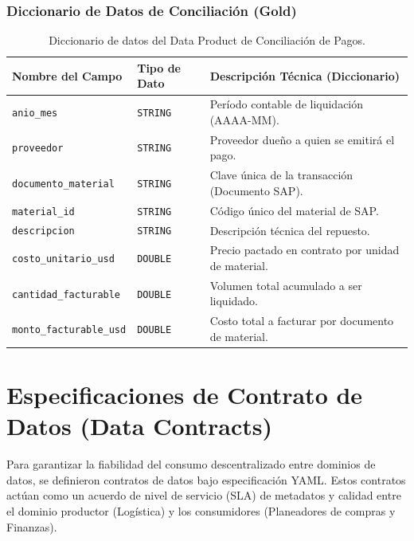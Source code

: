 \documentclass[11pt,a4paper]{article}
\begin{document}
\subsubsection{Diccionario de Datos de Conciliación (Gold)}
\begin{table}[h]
    \centering
    \footnotesize
    \begin{tabular}{lll}
        \toprule
        \textbf{Nombre del Campo} & \textbf{Tipo de Dato} & \textbf{Descripción Técnica (Diccionario)} \\
        \midrule
        \texttt{anio\_mes} & \texttt{STRING} & Período contable de liquidación (AAAA-MM). \\
        \texttt{proveedor} & \texttt{STRING} & Proveedor dueño a quien se emitirá el pago. \\
        \texttt{documento\_material} & \texttt{STRING} & Clave única de la transacción (Documento SAP). \\
        \texttt{material\_id} & \texttt{STRING} & Código único del material de SAP. \\
        \texttt{descripcion} & \texttt{STRING} & Descripción técnica del repuesto. \\
        \texttt{costo\_unitario\_usd} & \texttt{DOUBLE} & Precio pactado en contrato por unidad de material. \\
        \texttt{cantidad\_facturable} & \texttt{DOUBLE} & Volumen total acumulado a ser liquidado. \\
        \texttt{monto\_facturable\_usd} & \texttt{DOUBLE} & Costo total a facturar por documento de material. \\
        \bottomrule
    \end{tabular}
    \caption{Diccionario de datos del Data Product de Conciliación de Pagos.}
\end{table}

\newpage
\section{Especificaciones de Contrato de Datos (Data Contracts)}
Para garantizar la fiabilidad del consumo descentralizado entre dominios de datos, se definieron contratos de datos bajo especificación YAML. Estos contratos actúan como un acuerdo de nivel de servicio (SLA) de metadatos y calidad entre el dominio productor (Logística) y los consumidores (Planeadores de compras y Finanzas).
\end{document}
